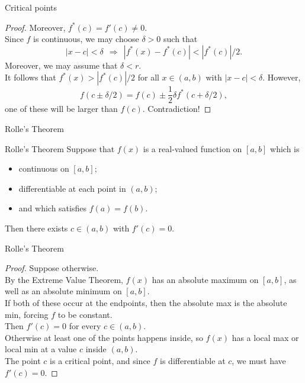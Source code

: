 \documentclass{beamer}
\begin{document}
\begin{frame}{Critical points}
\begin{proof}
Moreover, $f^*(c) = f'(c)\neq 0$.\\
\pause
Since $f$ is continuous, we may choose $\delta > 0$ such that
$$|x-c| < \delta\ \ \Rightarrow\ \ |f^*(x) - f^*(c)| < |f^*(c)|/2.$$
\pause
Moreover, we may assume that $\delta < r$.\\
\pause
It follows that $f^*(x) > |f^*(c)|/2$ for all $x\in (a,b)$ with $|x-c|<\delta$.
\pause
However,
$$f(c\pm \delta/2) = f(c) \pm \frac{1}{2}\delta f^*(c+\delta/2),$$
one of these will be larger than $f(c)$.  \pause Contradiction!
\end{proof}
\end{frame}

\begin{frame}{Rolle's Theorem}
\begin{thm}{Rolle's Theorem}
Suppose that $f(x)$ is a real-valued function on $[a,b]$ which is
\begin{itemize}
\pause
\item continuous on $[a,b]$;
\pause
\item differentiable at each point in $(a,b)$;
\pause
\item and which satisfies $f(a) = f(b)$.
\end{itemize}
\pause
Then there exists $c\in (a,b)$ with $f'(c) = 0$.
\end{thm}
\end{frame}

\begin{frame}{Rolle's Theorem}
\begin{proof}
Suppose otherwise.\\
\pause
By the Extreme Value Theorem, $f(x)$ has an absolute maximum on $[a,b]$, as well as an absolute minimum on $[a,b]$.\\
\pause
If both of these occur at the endpoints, then the absolute max is the absolute min, forcing $f$ to be constant.\\
\pause
Then $f'(c)=0$ for every $c\in (a,b)$.\\
\pause
Otherwise at least one of the points happens inside, so $f(x)$ has a local max or local min at a value $c$ inside $(a,b)$.\\
\pause
The point $c$ is a critical point, and since $f$ is differentiable at $c$, we must have $f'(c)=0$.
\end{proof}
\end{frame}
\end{document}
